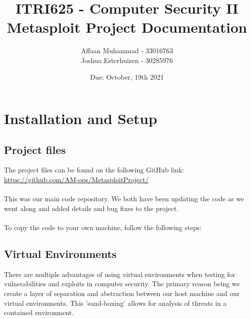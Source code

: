 \documentclass[a4paper, 12pt, titlepage]{report}
\begin{document}
\linespread{1.5}
\author{Affaan Muhammad - 33016763\\Joshua Esterhuizen - 30285976}
\title{ITRI625 - Computer Security II\\Metasploit Project Documentation}
\date{Due: October, 19th 2021}
\maketitle
\tableofcontents{}
\chapter{Installation and Setup}
\section{Project files}
The project files can be found on the following GitHub link:\\
\url{https://github.com/AM-ops/MetasploitProject/}
\\\\This was our main code repository. We both have been updating the code as we went along and added details and bug fixes to the project.\\\\
To copy the code to your own machine, follow the following steps:
\section{Virtual Environments}
\label{sec:sec2}
There are multiple advantages of using virtual environments when testing for vulnerabilities and exploits in computer security. The primary reason being we create a layer of separation and abstraction between our host machine and our virtual environments. This 'sand-boxing' allows for analysis of threats in a contained environment.
\end{document}
